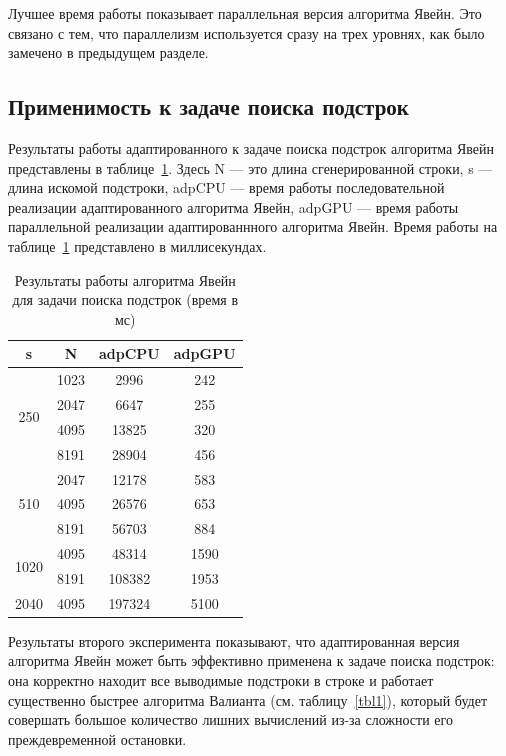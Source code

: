 Лучшее время работы показывает параллельная версия алгоритма Явейн. Это связано с тем, что параллелизм используется сразу на трех уровнях, как было замечено в предыдущем разделе.

\subsection{Применимость к задаче поиска подстрок}

Результаты работы адаптированного к задаче поиска подстрок алгоритма Явейн представлены в таблице~\ref{tbl3}. Здесь N --– это длина сгенерированной строки, s --- длина искомой подстроки, adpCPU --- время работы последовательной реализации адаптированного алгоритма Явейн, adpGPU --- время работы параллельной реализации адаптированнного алгоритма Явейн.
Время работы на таблице~\ref{tbl3} представлено в миллисекундах.

\begin{table}[h]

\begin{center}
\caption{Результаты работы алгоритма Явейн для задачи поиска подстрок (время в мс)}
\label{tbl3}
    \begin{tabular}{ ||c||c||c|c|| }
    \hline
    s & N & adpCPU &  adpGPU \\
    \hline
    \multirow{4}{2em}{250} & 1023 & 2996 & 242 \\
    & 2047 & 6647 & 255\\
    & 4095 & 13825 & 320\\
    & 8191 & 28904 & 456\\
    \hline
    \multirow{3}{2em}{510} & 2047 & 12178 & 583\\
    & 4095 & 26576 & 653\\
    & 8191 & 56703 & 884\\
    \hline
    \multirow{2}{2em}{1020} & 4095 & 48314 & 1590 \\
    & 8191 & 108382 & 1953\\
    \hline
    2040 & 4095 & 197324 & 5100\\
    \hline
    \end{tabular}
\end{center}

\end{table}


Результаты второго эксперимента показывают, что адаптированная версия алгоритма Явейн может быть эффективно применена к задаче поиска подстрок: она корректно находит все выводимые подстроки в строке и работает существенно быстрее алгоритма Валианта (см. таблицу~\ref{tbl1}), который будет совершать большое количество лишних вычислений из-за сложности его преждевременной остановки.

